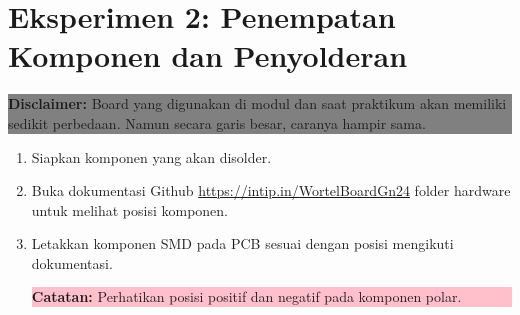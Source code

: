 \section{Eksperimen 2: Penempatan Komponen dan Penyolderan}
\begin{center}
    \colorbox{gray}{\parbox{0.8\linewidth}{\textbf{Disclaimer:} Board yang digunakan di modul dan saat praktikum akan memiliki sedikit perbedaan. Namun secara garis besar, caranya hampir sama.}}
\end{center}
\begin{enumerate}
    \item Siapkan komponen yang akan disolder.
    \item Buka dokumentasi Github \url{https://intip.in/WortelBoardGn24} folder hardware untuk melihat posisi komponen.
    \item Letakkan komponen SMD pada PCB sesuai dengan posisi mengikuti dokumentasi.
    \begin{center}
        \colorbox{pink}{\parbox{0.8\linewidth}{\textbf{Catatan:} Perhatikan posisi positif dan negatif pada komponen polar.}}
    \end{center}
    

\end{enumerate}
